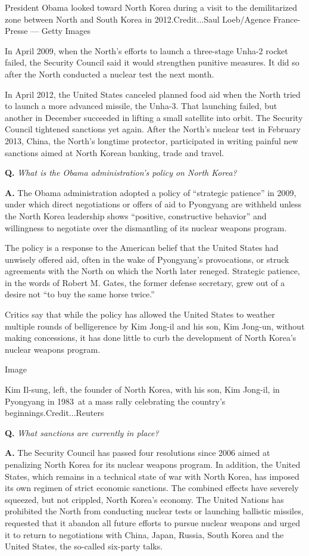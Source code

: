 President Obama looked toward North Korea during a visit to the
demilitarized zone between North and South Korea in 2012.Credit...Saul
Loeb/Agence France-Presse --- Getty Images

In April 2009, when the North's efforts to launch a three-stage Unha-2
rocket failed, the Security Council said it would strengthen punitive
measures. It did so after the North conducted a nuclear test the next
month.

In April 2012, the United States canceled planned food aid when the
North tried to launch a more advanced missile, the Unha-3. That
launching failed, but another in December succeeded in lifting a small
satellite into orbit. The Security Council tightened sanctions yet
again. After the North's nuclear test in February 2013, China, the
North's longtime protector, participated in writing painful new
sanctions aimed at North Korean banking, trade and travel.

\textbf{Q.} \emph{What is the Obama administration's policy on North
Korea?}

\textbf{A.} The Obama administration adopted a policy of ``strategic
patience'' in 2009, under which direct negotiations or offers of aid to
Pyongyang are withheld unless the North Korea leadership shows
``positive, constructive behavior'' and willingness to negotiate over
the dismantling of its nuclear weapons program.

The policy is a response to the American belief that the United States
had unwisely offered aid, often in the wake of Pyongyang's provocations,
or struck agreements with the North on which the North later reneged.
Strategic patience, in the words of Robert M. Gates, the former defense
secretary, grew out of a desire not ``to buy the same horse twice.''

Critics say that while the policy has allowed the United States to
weather multiple rounds of belligerence by Kim Jong-il and his son, Kim
Jong-un, without making concessions, it has done little to curb the
development of North Korea's nuclear weapons program.

Image

Kim Il-sung, left, the founder of North Korea, with his son, Kim
Jong-il, in Pyongyang in 1983~at a mass rally celebrating the country's
beginnings.Credit...Reuters

\textbf{Q.} \emph{What sanctions are currently in place?}

\textbf{A.} The Security Council has passed four resolutions since 2006
aimed at penalizing North Korea for its nuclear weapons program. In
addition, the United States, which remains in a technical state of war
with North Korea, has imposed its own regimen of strict economic
sanctions. The combined effects have severely squeezed, but not
crippled, North Korea's economy. The United Nations has prohibited the
North from conducting nuclear tests or launching ballistic missiles,
requested that it abandon all future efforts to pursue nuclear weapons
and urged it to return to negotiations with China, Japan, Russia, South
Korea and the United States, the so-called six-party talks.

